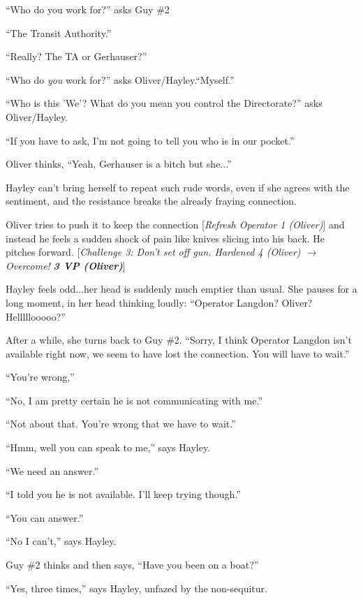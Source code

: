``Who do you work for?'' asks Guy \#2

``The Transit Authority.''

``Really?  The TA or Gerhauser?''

``Who do \textit{you }work for?'' asks Oliver/Hayley.``Myself.''



``Who is this 'We'?  What do you mean you control the Directorate?'' asks Oliver/Hayley.

``If you have to ask, I'm not going to tell you who is in our pocket.''



Oliver thinks, ``Yeah, Gerhauser is a bitch but she...''

Hayley can't bring herself to repeat such rude words, even if she agrees with the sentiment, and the resistance breaks the already fraying connection.



Oliver tries to push it to keep the connection {[}\textit{Refresh Operator 1 (Oliver)}{]} and instead he feels a sudden shock of pain like knives slicing into his back.  He pitches forward.  {[}\textit{Challenge 3: Don't set off gun.  Hardened 4 (Oliver) $\rightarrow$ Overcome! }\textit{\textbf{3 VP (Oliver)}}{]}



Hayley feels odd...her head is suddenly much emptier than usual.  She pauses for a long moment, in her head thinking loudly: ``Operator Langdon?  Oliver?  Helllllooooo?''



After a while, she turns back to Guy \#2.  ``Sorry, I think Operator Langdon isn't available right now, we seem to have lost the connection.  You will have to wait.''

``You're wrong,''

``No, I am pretty certain he is not communicating with me.''

``Not about that.  You're wrong that we have to wait.''

``Hmm, well you can speak to me,'' says Hayley.

``We need an answer.'' 

``I told you he is not available.  I'll keep trying though.''

``You can answer.''

``No I can't,'' says Hayley.

Guy \#2 thinks and then says, ``Have you been on a boat?''

``Yes, three times,'' says Hayley, unfazed by the non-sequitur.

